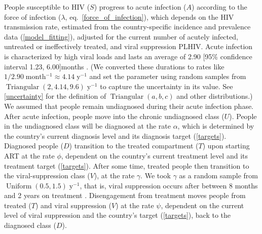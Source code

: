 \documentclass{article}
\DeclareMathOperator{\Uniform}{Uniform}
\DeclareMathOperator{\Triangular}{Triangular}
\begin{document}
People susceptible to HIV ($S$) progress to acute infection ($A$)
according to the force of infection ($\lambda$,
eq.~\eqref{force_of_infection}), which depends on the HIV transmission
rate, estimated from the country-specific incidence and prevalence
data (\autoref{model_fitting}), adjusted for the current number of
acutely infected, untreated or ineffectively treated, and viral
suppression PLHIV.  Acute infection is characterized by high viral
loads and lasts an average of 2.90 [95\% confidence interval 1.23,
6.00]\;months \cite{Hollingsworth2008-iy}.  (We converted these
durations to rates like $1 / 2.90\;\text{month$^{-1}$} \approx
4.14\;\text{y$^{-1}$}$ and set the parameter using random samples from
$\Triangular(2, 4.14, 9.6)\;\text{y$^{-1}$}$ to capture the
uncertainty in its value.  See \autoref{uncertainty} for the
definition of $\Triangular(a, b, c)$ and other distributions.)  We
assumed that people remain undiagnosed during their acute infection
phase. After acute infection, people move into the chronic undiagnosed
class ($U$).  People in the undiagnosed class will be diagnosed at the
rate $\alpha$, which is determined by the country's current diagnosis
level and its diagnosis target (\autoref{targets}).  Diagnosed people
($D$) transition to the treated compartment ($T$) upon starting ART at
the rate $\phi$, dependent on the country's current treatment level
and its treatment target (\autoref{targets}).  After some time,
treated people then transition to the viral-suppression class ($V$),
at the rate $\gamma$.  We took $\gamma$ as a random sample from
$\Uniform(0.5, 1.5)\;\text{y$^{-1}$}$, that is, viral suppression
occurs after between 8 months and 2 years on treatment
\cite{Currie2009-yz}.  Disengagement from treatment moves people from
treated ($T$) and viral suppression ($V$) at the rate $\psi$,
dependent on the current level of viral suppression and the country's
target (\autoref{targets}), back to the diagnosed class ($D$).
\end{document}
